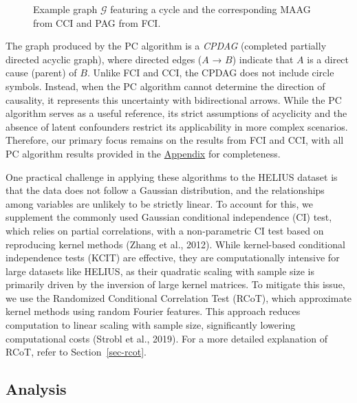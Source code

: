 \documentclass[
]{article}
\begin{document}
\begin{figure}
\begin{minipage}{0.33\linewidth}
{}


\end{minipage}%

\caption{\label{fig-examplegraphs}Example graph \(\mathcal{G}\)
featuring a cycle and the corresponding MAAG from CCI and PAG from FCI.}

\end{figure}%

The graph produced by the PC algorithm is a \emph{CPDAG} (completed
partially directed acyclic graph), where directed edges (\(A\) → \(B\))
indicate that \(A\) is a direct cause (parent) of \(B\). Unlike FCI and
CCI, the CPDAG does not include circle symbols. Instead, when the PC
algorithm cannot determine the direction of causality, it represents
this uncertainty with bidirectional arrows. While the PC algorithm
serves as a useful reference, its strict assumptions of acyclicity and
the absence of latent confounders restrict its applicability in more
complex scenarios. Therefore, our primary focus remains on the results
from FCI and CCI, with all PC algorithm results provided in the
\hyperref[sec-appendix]{Appendix} for completeness.

One practical challenge in applying these algorithms to the HELIUS
dataset is that the data does not follow a Gaussian distribution, and
the relationships among variables are unlikely to be strictly linear. To
account for this, we supplement the commonly used Gaussian conditional
independence (CI) test, which relies on partial correlations, with a
non-parametric CI test based on reproducing kernel methods (Zhang et
al., 2012). While kernel-based conditional independence tests (KCIT) are
effective, they are computationally intensive for large datasets like
HELIUS, as their quadratic scaling with sample size is primarily driven
by the inversion of large kernel matrices. To mitigate this issue, we
use the Randomized Conditional Correlation Test (RCoT), which
approximate kernel methods using random Fourier features. This approach
reduces computation to linear scaling with sample size, significantly
lowering computational costs (Strobl et al., 2019). For a more detailed
explanation of RCoT, refer to Section~\ref{sec-rcot}.

\subsection{Analysis}\label{analysis}
\end{document}
